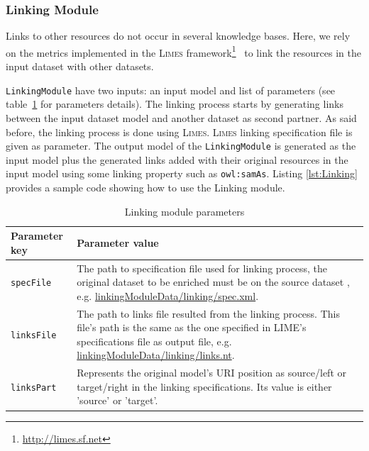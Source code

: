 \documentclass[a4paper,twoside,bibtotoc,abstracton,12pt,BCOR=15mm]{article}
\newcommand{\limes}{\textsc{Limes}\xspace}
\begin{document}
    \subsubsection{Linking Module}
    Links to other resources do not occur in several knowledge bases.
    Here, we rely on the metrics implemented in the \limes framework\footnote{\url{http://limes.sf.net}}~\cite{NGAU11,NGON12c,NGO+13c} to link the resources in the input dataset with other datasets.
  
    \texttt{LinkingModule} have two inputs: an input model and list of parameters (see table~\ref{tbl:linkingPram} for parameters details).
    The linking process starts by generating links between the input dataset model and another dataset as second partner. 
    As said before, the linking process is done using \limes.
    \limes linking specification file is given as parameter.
    The output model of the \texttt{LinkingModule} is generated as the input model plus the generated links added with their original resources in the input model using    some linking property such as \texttt{owl:samAs}.
    Listing \ref{lst:Linking} provides a sample code showing how to use the Linking module.

    \begin{table}
    \caption{Linking module parameters} \label{tbl:linkingPram}
    \small
    \begin{tabularx}{\textwidth}{@{}lX@{}}
    \toprule
    \textbf{Parameter key} 	&  \textbf{Parameter value}\\
    \toprule
    \texttt{specFile}	& The path to specification file used for linking process, the original dataset to be enriched must be on the source dataset , e.g. \url {linkingModuleData/linking/spec.xml}.\\
    \midrule
    \texttt{linksFile}	& The path to links file resulted from the linking process. This file's path is the same as the one specified in LIME's specifications file as output file, e.g. \url {linkingModuleData/linking/links.nt}.\\
    \midrule
    \texttt{linksPart} 	& Represents the original model's URI position as source/left or target/right in the linking specifications. Its value is either 'source' or 'target'.\\ 
    \bottomrule
    \end{tabularx}
    \end{table}
\end{document}
